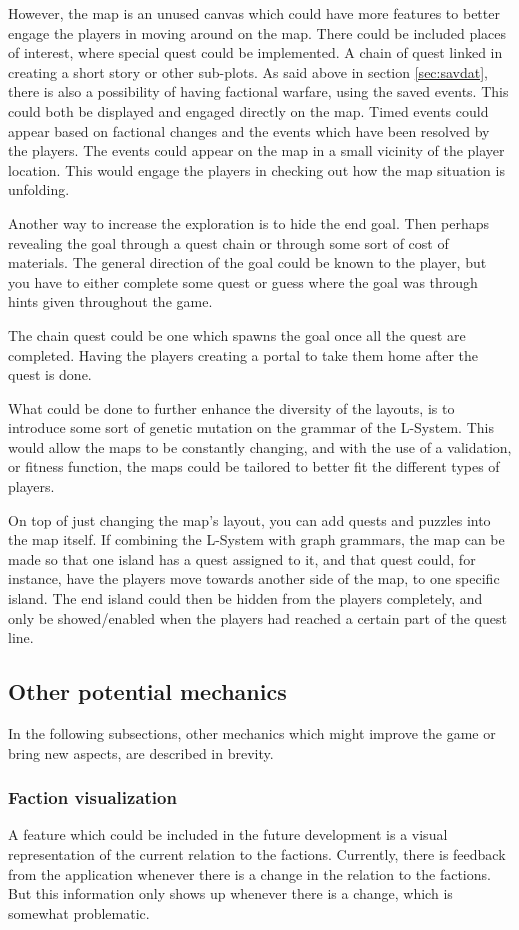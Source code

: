However, the map is an unused canvas which could have more features to better engage the players in moving around on the map. 
There could be included places of interest, where special quest could be implemented. A chain of quest linked in creating a short story or other sub-plots. 
As said above in section \ref{sec:savdat}, there is also a possibility of having factional warfare, using the saved events. This could both be displayed and engaged directly on the map. 
Timed events could appear based on factional changes and the events which have been resolved by the players. The events could appear on the map in a small vicinity of the player location. This would engage the players in checking out how the map situation is unfolding. 

Another way to increase the exploration is to hide the end goal. Then perhaps revealing the goal through a quest chain or through some sort of cost of materials. The general direction of the goal could be known to the player, but you have to either complete some quest or guess where the goal was through hints given throughout the game.

The chain quest could be one which spawns the goal once all the quest are completed. Having the players creating a portal to take them home after the quest is done.

What could be done to further enhance the diversity of the layouts, is to introduce some sort of genetic mutation on the grammar of the L-System. This would allow the maps to be constantly changing, and with the use of a validation, or fitness function, the maps could be tailored to better fit the different types of players.

On top of just changing the map's layout, you can add quests and puzzles into the map itself. If combining the L-System with graph grammars, the map can be made so that one island has a quest assigned to it, and that quest could, for instance, have the players move towards another side of the map, to one specific island. 
The end island could then be hidden from the players completely, and only be showed/enabled when the players had reached a certain part of the quest line.

\subsection{Other potential mechanics}
In the following subsections, other mechanics which might improve the game or bring new aspects, are described in brevity. 
\subsubsection{Faction visualization}
A feature which could be included in the future development is a visual representation of the current relation to the factions.
Currently, there is feedback from the application whenever there is a change in the relation to the factions. But this information only shows up whenever there is a change, which is somewhat problematic. 

